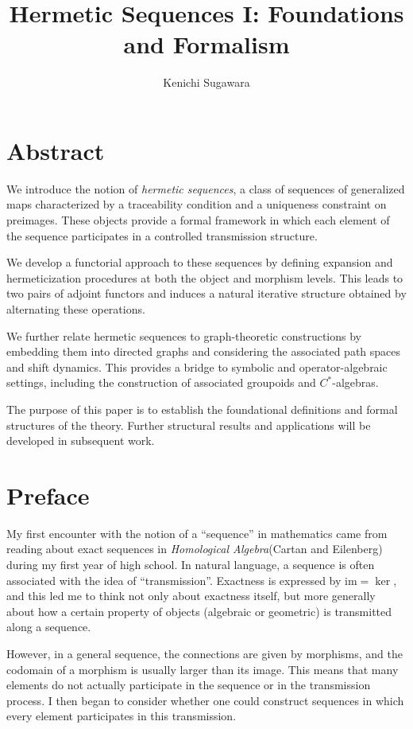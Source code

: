 \documentclass[11pt]{book}
\title{Hermetic Sequences I: Foundations and Formalism}
\author{Kenichi Sugawara}
\theoremstyle{definition}
\theoremstyle{plain}
\theoremstyle{remark}
\begin{document}
\maketitle


\chapter*{Abstract}
\medskip
We introduce the notion of \emph{hermetic sequences}, a class of sequences of generalized maps characterized by a 
traceability condition and a uniqueness constraint on preimages. These objects provide a formal framework in which 
each element of the sequence participates in a controlled transmission structure.

We develop a functorial approach to these sequences by defining expansion and hermeticization procedures at both 
the object and morphism levels. This leads to two pairs of adjoint functors and induces a natural iterative structure
obtained by alternating these operations.

We further relate hermetic sequences to graph-theoretic constructions by embedding them into directed graphs and 
considering the associated path spaces and shift dynamics. This provides a bridge to symbolic and operator-algebraic 
settings, including the construction of associated groupoids and $C^*$-algebras.

The purpose of this paper is to establish the foundational definitions and formal structures of the theory. 
Further structural results and applications will be developed in subsequent work.


\tableofcontents

\chapter*{Preface}

My first encounter with the notion of a ``sequence'' in mathematics came from reading about exact sequences in 
\emph{Homological Algebra}(Cartan and Eilenberg) during my first year of high school. In natural language, a sequence 
is often associated with the idea of ``transmission''. Exactness is expressed by $\mathrm{im} = \ker$, and this led me 
to think not only about exactness itself, but more generally about how a certain property of objects (algebraic or 
geometric) is transmitted along a sequence.
\medskip

However, in a general sequence, the connections are given by morphisms, and the codomain of a morphism is usually 
larger than its image. This means that many elements do not actually participate in the sequence or in the transmission 
process. I then began to consider whether one could construct sequences in which every element participates in this 
transmission. 
\end{document}

